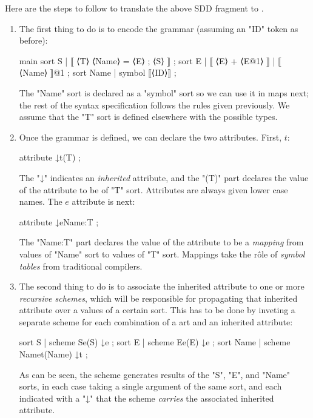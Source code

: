 \documentclass[11pt]{article} %
\begin{document}
Here are the steps to follow to translate the above SDD fragment to \HAX.
\begin{enumerate}

\item The first thing to do is to encode the grammar (assuming an "ID" token as before):
\begin{hacs}
   main sort S  | ⟦ ⟨T⟩ ⟨Name⟩ = ⟨E⟩ ; ⟨S⟩ ⟧ ;
   sort E  | ⟦ ⟨E⟩ + ⟨E@1⟩ ⟧   | ⟦ ⟨Name⟩ ⟧@1 ;
   sort Name | symbol ⟦⟨ID⟩⟧ ;
\end{hacs}
  The "Name" sort is declared as a "symbol" sort so we can use it in maps next; the rest of the
  syntax specification follows the rules given previously. We assume that the "T" sort is defined
  elsewhere with the possible types.

\item Once the grammar is defined, we can declare the two attributes. First, $t$:
\begin{hacs}
   attribute ↓t(T) ;
\end{hacs}
  The "↓" indicates an \emph{inherited} attribute, and the "(T)" part declares the value of
  the attribute to be of "T" sort. Attributes are always given lower case names. The $e$ attribute
  is next:
\begin{hacs}
   attribute ↓e{Name:T} ;
\end{hacs}
  The "{Name:T}" part declares the value of the attribute to be a \emph{mapping} from values of
  "Name" sort to values of "T" sort. Mappings take the rôle of \emph{symbol tables} from traditional
  compilers.

\item The second thing to do is to associate the inherited attribute to one or more \emph{recursive
    schemes}, which will be responsible for propagating that inherited attribute over a values of a
  certain sort.  This has to be done by inveting a separate scheme for each combination of a art and
  an inherited attribute:
\begin{hacs}
   sort S | scheme Se(S) ↓e ;
   sort E | scheme Ee(E) ↓e ;
   sort Name | scheme Namet(Name) ↓t ;
\end{hacs}
  As can be seen, the scheme generates results of the "S", "E", and "Name" sorts, in each case taking a
  single argument of the same sort, and each indicated with a "↓" that the scheme \emph{carries} the
  associated inherited attribute.


\end{enumerate}
\end{document}
